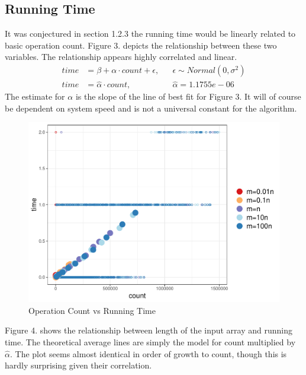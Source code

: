 \documentclass{article}
\begin{document}
\pagebreak

\subsection{Running Time}
It was conjectured in section 1.2.3 the running time would be linearly related to basic operation count. Figure 3. depicts the relationship between these two variables. The relationship appears highly correlated and linear.
\begin{align*}
time &= \beta + \alpha \cdot count + \epsilon, && \epsilon \sim Normal(0, \sigma^2) \\
time &= \hat{\alpha} \cdot count, && \hat{\alpha} = 1.1755e-06
\end{align*}
The estimate for $\alpha$ is the slope of the line of best fit for Figure 3. It will of course be dependent on system speed and is not a universal constant for the algorithm.

\begin{figure}[htbp]
\includegraphics{report-plot3}
\caption{Operation Count vs Running Time}
\end{figure}

\pagebreak
Figure 4. shows the relationship between length of the input array and running time. The theoretical average lines are simply the model for count multiplied by $\hat{\alpha}$. The plot seems almost identical in order of growth to count, though this is hardly surprising given their correlation.
\end{document}
